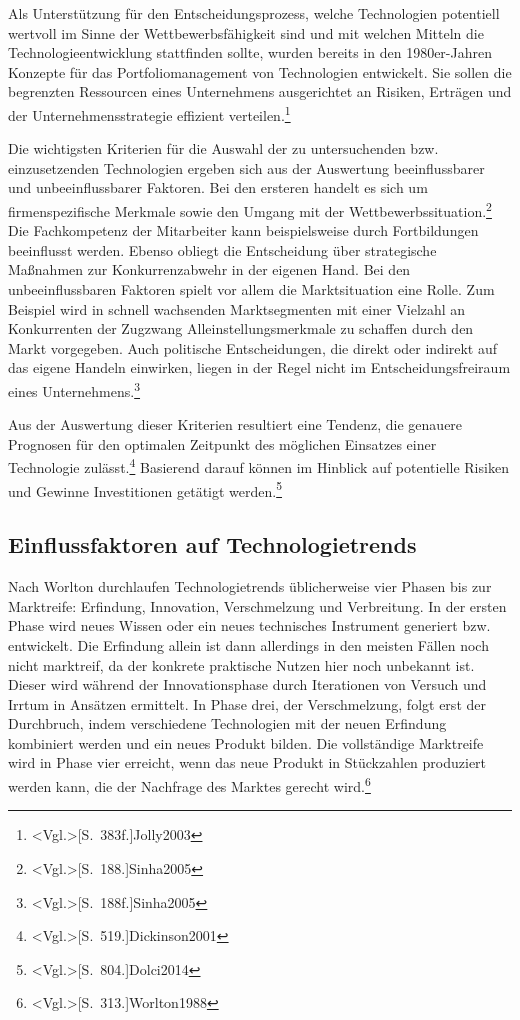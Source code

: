 Als Unterstützung für den Entscheidungsprozess, welche Technologien potentiell wertvoll im Sinne der Wettbewerbsfähigkeit sind und mit welchen Mitteln die Technologieentwicklung stattfinden sollte, wurden bereits in den 1980er-Jahren Konzepte für das Portfoliomanagement von Technologien entwickelt. Sie sollen die begrenzten Ressourcen eines Unternehmens ausgerichtet an Risiken, Erträgen und der Unternehmensstrategie effizient verteilen.\footnote{\citeNP<Vgl.>[S.~383f.]{Jolly2003}}

Die wichtigsten Kriterien für die Auswahl der zu untersuchenden bzw. einzusetzenden Technologien ergeben sich aus der Auswertung beeinflussbarer und unbeeinflussbarer Faktoren. Bei den ersteren handelt es sich um firmenspezifische Merkmale sowie den Umgang mit der Wettbewerbssituation.\footnote{\citeNP<Vgl.>[S.~188.]{Sinha2005}} Die Fachkompetenz der Mitarbeiter kann beispielsweise durch Fortbildungen beeinflusst werden. Ebenso obliegt die Entscheidung über strategische Maßnahmen zur Konkurrenzabwehr in der eigenen Hand. Bei den unbeeinflussbaren Faktoren spielt vor allem die Marktsituation eine Rolle. Zum Beispiel wird in schnell wachsenden Marktsegmenten mit einer Vielzahl an Konkurrenten der Zugzwang Alleinstellungsmerkmale zu schaffen durch den Markt vorgegeben. Auch politische Entscheidungen, die direkt oder indirekt auf das eigene Handeln einwirken, liegen in der Regel nicht im Entscheidungsfreiraum eines Unternehmens.\footnote{\citeNP<Vgl.>[S.~188f.]{Sinha2005}}

Aus der Auswertung dieser Kriterien resultiert eine Tendenz, die genauere Prognosen für den optimalen Zeitpunkt des möglichen Einsatzes einer Technologie zulässt.\footnote{\citeNP<Vgl.>[S.~519.]{Dickinson2001}} Basierend darauf können im Hinblick auf potentielle Risiken und Gewinne Investitionen getätigt werden.\footnote{\citeNP<Vgl.>[S.~804.]{Dolci2014}}

\subsection{Einflussfaktoren auf Technologietrends}
Nach Worlton durchlaufen Technologietrends üblicherweise vier Phasen bis zur Marktreife: Erfindung, Innovation, Verschmelzung und Verbreitung. In der ersten Phase wird neues Wissen oder ein neues technisches Instrument generiert bzw. entwickelt. Die Erfindung allein ist dann allerdings in den meisten Fällen noch nicht marktreif, da der konkrete praktische Nutzen hier noch unbekannt ist. Dieser wird während der Innovationsphase durch Iterationen von Versuch und Irrtum in Ansätzen ermittelt. In Phase drei, der Verschmelzung, folgt erst der Durchbruch, indem verschiedene Technologien mit der neuen Erfindung kombiniert werden und ein neues Produkt bilden. Die vollständige Marktreife wird in Phase vier erreicht, wenn das neue Produkt in Stückzahlen produziert werden kann, die der Nachfrage des Marktes gerecht wird.\footnote{\citeNP<Vgl.>[S.~313.]{Worlton1988}}


